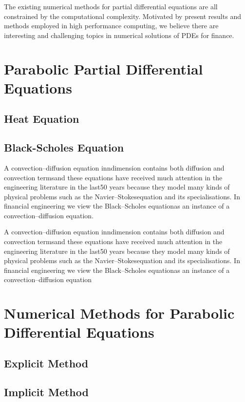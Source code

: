 \documentclass[12pt, oneside]{book}
\theoremstyle{plain}
\theoremstyle{definition}
\begin{document}
The existing numerical methods for partial differential equations are all constrained by the computational complexity. Motivated by present results and methods employed in high performance computing, we believe there are interesting and challenging topics in numerical solutions of PDEs for finance.

\section{Parabolic Partial Differential Equations}\label{Parabolic Partial Differential Equations}

\subsection{Heat Equation}

\subsection{Black-Scholes Equation}
A convection–diffusion equation inndimension contains both diffusion and convection termsand  these  equations  have  received  much  attention  in  the  engineering  literature  in  the  last50 years because they model many kinds of physical problems such as the Navier–Stokesequation and its specialisations. In financial engineering we view the Black–Scholes equationas an instance of a convection–diffusion equation.

A convection–diffusion equation inndimension contains both diffusion and convection termsand  these  equations  have  received  much  attention  in  the  engineering  literature  in  the  last50 years because they model many kinds of physical problems such as the Navier–Stokesequation and its specialisations. In financial engineering we view the Black–Scholes equationas an instance of a convection–diffusion equation

\section{Numerical Methods for Parabolic Differential Equations}

\subsection{Explicit Method}

\subsection{Implicit Method}
\end{document}
